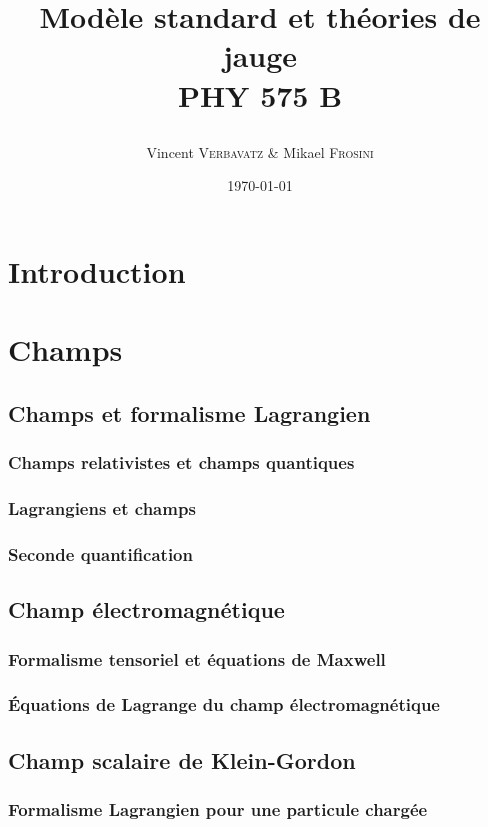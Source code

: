 \documentclass{article}
\title{Modèle standard et théories de jauge \n{2} \\\textsc{PHY 575 B}\\\n2 \date{\today}}
\author{Vincent \textsc{Verbavatz} \& Mikael \textsc{Frosini}}
\begin{document}
		
		\maketitle
		\pagebreak
		\tableofcontents
		
		\pagebreak
		
	\section{Introduction}


	\section{Champs}
		\subsection{Champs et formalisme Lagrangien}
			\subsubsection{Champs relativistes et champs quantiques}
			\subsubsection{Lagrangiens et champs}
			\subsubsection{Seconde quantification}
		\subsection{Champ électromagnétique}
			\subsubsection{Formalisme tensoriel et équations de Maxwell}
			\subsubsection{Équations de Lagrange du champ électromagnétique}
		\subsection{Champ scalaire de Klein-Gordon}
			\subsubsection{Formalisme Lagrangien pour une particule chargée}
\end{document}

